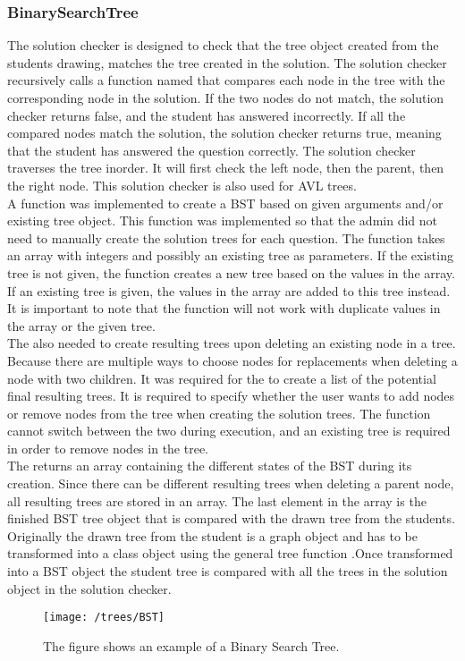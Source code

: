 \subsubsection{BinarySearchTree}
The solution checker is designed to check that the tree object created from the students drawing, matches the tree created in the solution. The solution checker recursively calls a function named  that compares each node in the tree with the corresponding node in the solution. If the two nodes do not match, the solution checker returns false, and the student has answered incorrectly. If all the compared nodes match the solution, the solution checker returns true, meaning that the student has answered the question correctly. The solution checker traverses the tree inorder. It will first check the left node, then the parent, then the right node. This solution checker is also used for AVL trees.
\\[11pt]
A function  was implemented to create a BST based on given arguments and/or existing tree object. This function was implemented so that the admin did not need to manually create the solution trees for each question. The function takes an array with integers and possibly an existing tree as parameters. If the existing tree is not given, the function creates a new tree based on the values in the array. If an existing tree is given, the values in the array are added to this tree instead. It is important to note that the function will not work with duplicate values in the array or the given tree.
\\[11pt]
The  also needed to create resulting trees upon deleting an existing node in a tree. Because there are multiple ways to choose nodes for replacements when deleting a node with two children. It was required for the  to create a list of the potential final resulting trees. It is required to specify whether the user wants to add nodes or remove nodes from the tree when creating the solution trees. The function cannot switch between the two during execution, and an existing tree is required in order to remove nodes in the tree.
\\[11pt]
The  returns an array containing the different states of the BST during its creation. Since there can be different resulting trees when deleting a parent node, all resulting trees are stored in an array. The last element in the array is the finished BST tree object that is compared with the drawn tree from the students. Originally the drawn tree from the student is a graph object and has to be transformed into a  class object using the general tree function .Once transformed into a BST object the student tree is compared with all the trees in the solution object in the solution checker.
\begin{figure}[H]
    \centering
    \texttt{[image: /trees/BST]}
    \caption{The figure shows an example of a Binary Search Tree.}    
    \label{fig:BST}
\end{figure}